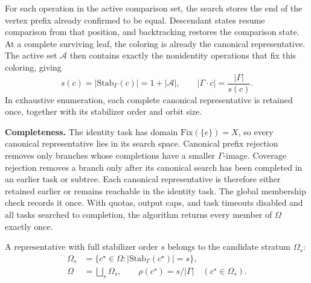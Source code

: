 \documentclass[a5paper, 10pt]{article}
\begin{document}
For each operation in the active comparison set, the search stores the end of the vertex prefix already confirmed to be equal. Descendant states resume comparison from that position, and backtracking restores the comparison state. At a complete surviving leaf, the coloring is already the canonical representative. The active set $\mathcal{A}$ then contains exactly the nonidentity operations that fix this coloring, giving
\begin{equation}
 s(c)=|\mathrm{Stab}_{\Gamma}(c)|=1+|\mathcal{A}|,
 \qquad |\Gamma\cdot c|=\frac{|\Gamma|}{s(c)}.
\label{eq:active_stabilizer}
\end{equation}
In exhaustive enumeration, each complete canonical representative is retained once, together with its stabilizer order and orbit size.

\medskip
\noindent\textbf{Completeness.}
The identity task has domain $\mathrm{Fix}(\{e\})=X$, so every canonical representative lies in its search space. Canonical prefix rejection removes only branches whose completions have a smaller $\Gamma$-image. Coverage rejection removes a branch only after its canonical search has been completed in an earlier task or subtree. Each canonical representative is therefore either retained earlier or remains reachable in the identity task. The global membership check records it once. With quotas, output caps, and task timeouts disabled and all tasks searched to completion, the algorithm returns every member of $\Omega$ exactly once.

A representative with full stabilizer order $s$ belongs to the candidate stratum $\Omega_s$:
\begin{equation}
\begin{aligned}
\Omega_s&=\{c^\star\in\Omega:|\mathrm{Stab}_{\Gamma}(c^\star)|=s\},\\
\Omega&=\bigsqcup_s\Omega_s,\qquad
\rho(c^\star)=s/|\Gamma|\quad(c^\star\in\Omega_s).
\end{aligned}
\label{eq:rho_strata}
\end{equation}
\end{document}
